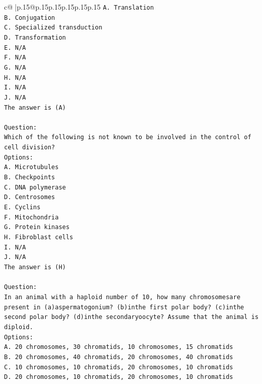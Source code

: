 \documentclass{article}
\begin{document}
{\begin{supertabular}{c@{$\;$}|p{.15\linewidth}@{}p{.15\linewidth}p{.15\linewidth}p{.15\linewidth}p{.15\linewidth}p{.15\linewidth}}
{{{\texttt{A. Translation} \\
\texttt{B. Conjugation} \\
\texttt{C. Specialized transduction} \\
\texttt{D. Transformation} \\
\texttt{E. N/A} \\
\texttt{F. N/A} \\
\texttt{G. N/A} \\
\texttt{H. N/A} \\
\texttt{I. N/A} \\
\texttt{J. N/A} \\
\texttt{The answer is (A)} \\
\\ 
\texttt{Question:} \\
\texttt{Which of the following is not known to be involved in the control of cell division?} \\
\texttt{Options:} \\
\texttt{A. Microtubules} \\
\texttt{B. Checkpoints} \\
\texttt{C. DNA polymerase} \\
\texttt{D. Centrosomes} \\
\texttt{E. Cyclins} \\
\texttt{F. Mitochondria} \\
\texttt{G. Protein kinases} \\
\texttt{H. Fibroblast cells} \\
\texttt{I. N/A} \\
\texttt{J. N/A} \\
\texttt{The answer is (H)} \\
\\ 
\texttt{Question:} \\
\texttt{In an animal with a haploid number of 10, how many chromosomesare present in (a)aspermatogonium? (b)inthe first polar body? (c)inthe second polar body? (d)inthe secondaryoocyte? Assume that the animal is diploid.} \\
\texttt{Options:} \\
\texttt{A. 20 chromosomes, 30 chromatids, 10 chromosomes, 15 chromatids} \\
\texttt{B. 20 chromosomes, 40 chromatids, 20 chromosomes, 40 chromatids} \\
\texttt{C. 10 chromosomes, 10 chromatids, 20 chromosomes, 10 chromatids} \\
\texttt{D. 20 chromosomes, 10 chromatids, 20 chromosomes, 10 chromatids} \\
}}}
\end{supertabular}}
\end{document}
